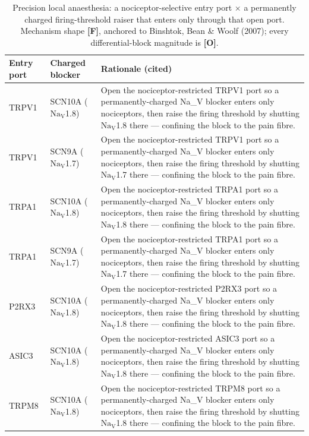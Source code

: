 \documentclass[11pt]{article}
\newcommand{\gF}{\textcolor{gf}{\textbf{[F]}}}
\newcommand{\gO}{\textcolor{go}{\textbf{[O]}}}
\newcommand{\NaVx}[2]{\ensuremath{\mathrm{#1_{V}}}#2}
\begin{document}
\begin{footnotesize}
\renewcommand{\arraystretch}{1.2}
\begin{longtable}{@{}>{\raggedright\arraybackslash}p{2.2cm}>{\raggedright\arraybackslash}p{2.6cm}>{\raggedright\arraybackslash}p{8.0cm}@{}}
\caption{Precision local anaesthesia: a nociceptor-selective entry port $\times$ a permanently charged firing-threshold raiser that enters only through that open port. Mechanism shape \gF{}, anchored to Binshtok, Bean \& Woolf (2007); every differential-block magnitude is \gO{}.}\label{tab:prec}\\
\toprule
\textbf{Entry port} & \textbf{Charged blocker} & \textbf{Rationale (cited)}\\
\midrule
\endhead
\bottomrule
\endlastfoot
TRPV1 & SCN10A (\NaVx{Na}{1.8}) & \footnotesize Open the nociceptor-restricted TRPV1 port so a permanently-charged Na\_V blocker enters only nociceptors, then raise the firing threshold by shutting \NaVx{Na}{1.8} there --- confining the block to the pain fibre.\\
TRPV1 & SCN9A (\NaVx{Na}{1.7}) & \footnotesize Open the nociceptor-restricted TRPV1 port so a permanently-charged Na\_V blocker enters only nociceptors, then raise the firing threshold by shutting \NaVx{Na}{1.7} there --- confining the block to the pain fibre.\\
TRPA1 & SCN10A (\NaVx{Na}{1.8}) & \footnotesize Open the nociceptor-restricted TRPA1 port so a permanently-charged Na\_V blocker enters only nociceptors, then raise the firing threshold by shutting \NaVx{Na}{1.8} there --- confining the block to the pain fibre.\\
TRPA1 & SCN9A (\NaVx{Na}{1.7}) & \footnotesize Open the nociceptor-restricted TRPA1 port so a permanently-charged Na\_V blocker enters only nociceptors, then raise the firing threshold by shutting \NaVx{Na}{1.7} there --- confining the block to the pain fibre.\\
P2RX3 & SCN10A (\NaVx{Na}{1.8}) & \footnotesize Open the nociceptor-restricted P2RX3 port so a permanently-charged Na\_V blocker enters only nociceptors, then raise the firing threshold by shutting \NaVx{Na}{1.8} there --- confining the block to the pain fibre.\\
ASIC3 & SCN10A (\NaVx{Na}{1.8}) & \footnotesize Open the nociceptor-restricted ASIC3 port so a permanently-charged Na\_V blocker enters only nociceptors, then raise the firing threshold by shutting \NaVx{Na}{1.8} there --- confining the block to the pain fibre.\\
TRPM8 & SCN10A (\NaVx{Na}{1.8}) & \footnotesize Open the nociceptor-restricted TRPM8 port so a permanently-charged Na\_V blocker enters only nociceptors, then raise the firing threshold by shutting \NaVx{Na}{1.8} there --- confining the block to the pain fibre.\\
\end{longtable}
\end{footnotesize}
\end{document}
